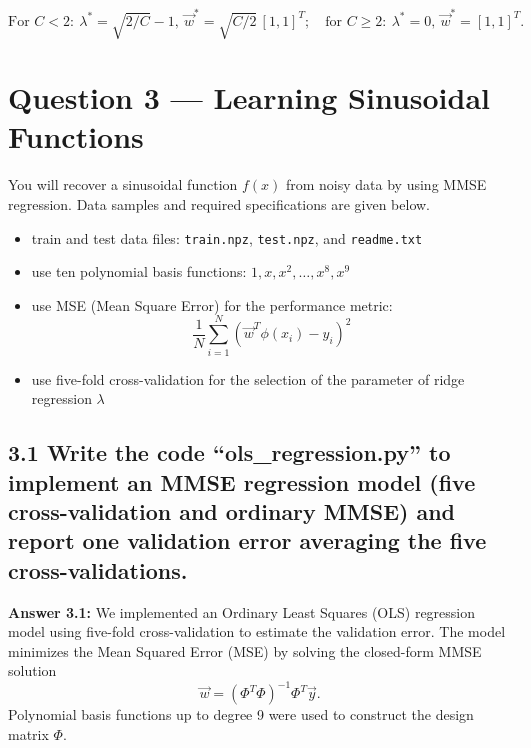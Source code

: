 \documentclass[12pt]{article}
\begin{document}
\[
\boxed{\text{For }C<2:\ \lambda^*=\sqrt{2/C}-1,\ \vec w^*=\sqrt{C/2}\,[1,1]^T;\quad
\text{for }C\ge 2:\ \lambda^*=0,\ \vec w^*=[1,1]^T.}
\]

\newpage
\section*{Question 3 — Learning Sinusoidal Functions}

You will recover a sinusoidal function $f(x)$ from noisy data by using MMSE regression. Data samples and required specifications are given below.

\begin{itemize}
  \item train and test data files: \texttt{train.npz}, \texttt{test.npz}, and \texttt{readme.txt}
  \item use ten polynomial basis functions: $1, x, x^2, \ldots, x^8, x^9$
  \item use MSE (Mean Square Error) for the performance metric:
  \[
  \frac{1}{N}\sum_{i=1}^N(\vec{w}^T\phi(x_i)-y_i)^2
  \]
  \item use five-fold cross-validation for the selection of the parameter of ridge regression $\lambda$
\end{itemize}

\subsection*{3.1
Write the code “ols\_regression.py” to implement an MMSE regression model (five cross-validation and ordinary MMSE) and report one validation error averaging the five cross-validations.}
\textbf{Answer 3.1:}  
We implemented an Ordinary Least Squares (OLS) regression model using five-fold cross-validation to estimate the validation error.  
The model minimizes the Mean Squared Error (MSE) by solving the closed-form MMSE solution 
\[
\vec{w} = (\Phi^T \Phi)^{-1} \Phi^T \vec{y}.
\]
Polynomial basis functions up to degree 9 were used to construct the design matrix $\Phi$.
\end{document}
